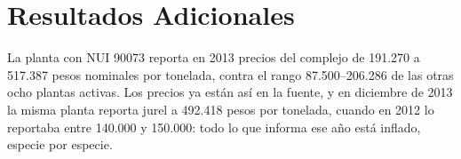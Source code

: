 \documentclass[11pt]{article}
\begin{document}
\newpage\appendix
\section{Resultados Adicionales}\label{sec:appendix}

La planta con NUI 90073 reporta en 2013 precios del complejo de 191.270 a 517.387 pesos nominales por tonelada, contra el rango 87.500--206.286 de las otras ocho plantas activas. Los precios ya están así en la fuente, y en diciembre de 2013 la misma planta reporta jurel a 492.418 pesos por tonelada, cuando en 2012 lo reportaba entre 140.000 y 150.000: todo lo que informa ese año está inflado, especie por especie.
\end{document}
